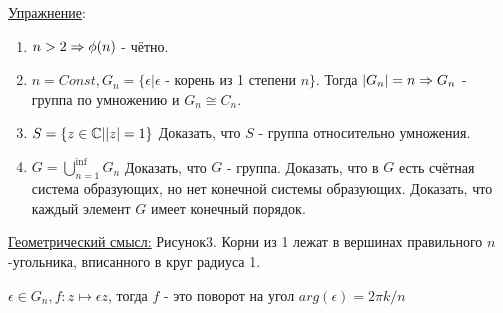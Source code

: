 \underline{Упражнение}:
\begin{enumerate}
\item $n > 2 \Rightarrow \phi(n)$ - чётно.
\item $n = Const, G_n = \{\epsilon | \epsilon$ - корень из 1 степени $n\}$. Тогда $|G_n| = n \Rightarrow G_n$ - группа по умножению и $G_n \cong C_n$.
\item $S = \{z \in \mathbb{C} | |z| = 1\}$ Доказать, что $S$ - группа относительно умножения.
\item $G = \bigcup\limits_{n = 1}^{\inf} G_n$ Доказать, что $G$ - группа. Доказать, что в $G$ есть счётная система образующих, но нет конечной системы образующих. Доказать, что каждый элемент $G$ имеет конечный порядок. 
\end{enumerate}

\underline{Геометрический смысл:}
Рисунок3. 
Корни из 1 лежат в вершинах правильного $n$-угольника, вписанного в круг радиуса 1.

$\epsilon \in G_n, f: z \mapsto \epsilon z$, тогда $f$ - это поворот на угол $arg(\epsilon) = {2 \pi k}/n$